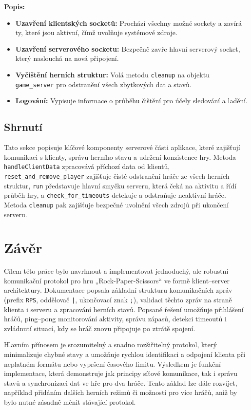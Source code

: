 \documentclass[12pt, a4paper]{article}
\begin{document}
\noindent
\textbf{Popis:}
\begin{itemize}
    \item \textbf{Uzavření klientských socketů:} Prochází všechny možné sockety a zavírá ty, které jsou aktivní, čímž uvolňuje systémové zdroje.
    \item \textbf{Uzavření serverového socketu:} Bezpečně zavře hlavní serverový socket, který naslouchá na nová připojení.
    \item \textbf{Vyčištění herních struktur:} Volá metodu \texttt{cleanup} na objektu \texttt{game\_server} pro odstranění všech zbytkových dat a stavů.
    \item \textbf{Logování:} Vypisuje informace o průběhu čištění pro účely sledování a ladění.
\end{itemize}

\subsection{Shrnutí}

Tato sekce popisuje klíčové komponenty serverové části aplikace, které zajišťují komunikaci s klienty, správu herního stavu a udržení konzistence hry. Metoda \texttt{handleClientData} zpracovává příchozí data od klientů, \texttt{reset\_and\_remove\_player} zajišťuje čisté odstranění hráče ze všech herních struktur, \texttt{run} představuje hlavní smyčku serveru, která čeká na aktivitu a řídí průběh hry, a \texttt{check\_for\_timeouts} detekuje a odstraňuje neaktivní hráče. Metoda \texttt{cleanup} pak zajišťuje bezpečné uvolnění všech zdrojů při ukončení serveru.

\section{Závěr}

Cílem této práce bylo navrhnout a implementovat jednoduchý, ale robustní komunikační protokol pro hru „Rock-Paper-Scissors“ ve formě klient–server architektury. Dokumentace popsala základní strukturu komunikačních zpráv (prefix \texttt{RPS}, oddělovač \texttt{|}, ukončovací znak \texttt{;}), validaci těchto zpráv na straně klienta i serveru a zpracování herních stavů. Popsané řešení umožňuje přihlášení hráčů, ping--pong monitorování aktivity, správu zápasů, detekci timeoutů i zvládnutí situací, kdy se hráč znovu připojuje po ztrátě spojení.

Hlavním přínosem je srozumitelný a snadno rozšiřitelný protokol, který minimalizuje chybné stavy a umožňuje rychlou identifikaci a odpojení klienta při neplatném formátu nebo vypršení časového limitu. Výsledkem je funkční implementace, která demonstruje jak principy síťové komunikace, tak i správu stavů a synchronizaci dat ve hře pro dva hráče. Tento základ lze dále rozvíjet, například přidáním dalších herních režimů či možností pro více hráčů, aniž by bylo nutné zásadně měnit stávající protokol.
\end{document}
